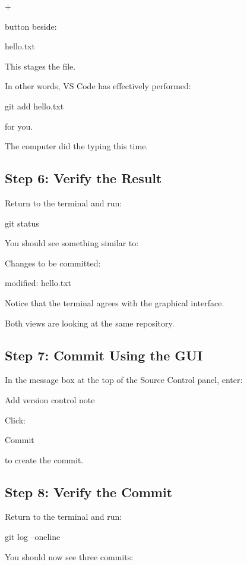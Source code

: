\documentclass{csc2059practical}
\begin{document}
+

button beside:

\begin{terminalplain}
hello.txt
\end{terminalplain}
This stages the file.

In other words, VS Code has effectively performed:

\begin{terminalplain}
git add hello.txt
\end{terminalplain}
for you.

The computer did the typing this time.

\subsection{Step 6: Verify the Result}
Return to the terminal and run:

\begin{terminalplain}
git status
\end{terminalplain}
You should see something similar to:

\begin{terminalplain}
Changes to be committed:

\hspace*{1cm}\textcolor{GitGreen}{modified: hello.txt}
\end{terminalplain}
Notice that the terminal agrees with the graphical interface.

Both views are looking at the same repository.

\subsection{Step 7: Commit Using the GUI}
In the message box at the top of the Source Control panel, enter:

Add version control note

Click:

Commit

to create the commit.

\subsection{Step 8: Verify the Commit}
Return to the terminal and run:

\begin{terminalplain}
git log --oneline
\end{terminalplain}
You should now see three commits:
\end{document}
